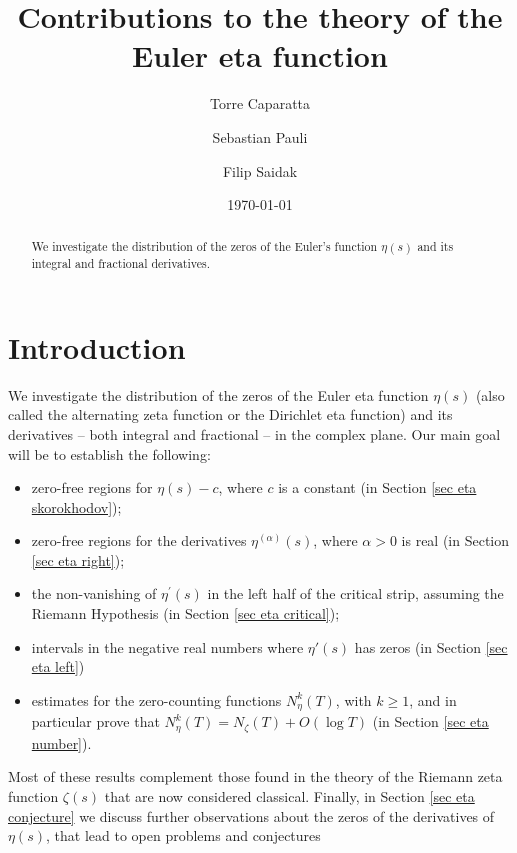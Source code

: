 \documentclass{amsart}
\title{Contributions to the theory of the Euler eta function}
\author[T. Caparatta]{Torre Caparatta}\email{tecapara@uncg.edu}
\author[S. Pauli]{Sebastian Pauli}\email{s\_pauli@uncg.edu}
\author[F. Saidak]{Filip Saidak}\email{f\_saidak@uncg.edu}
\date{\today}
\theoremstyle{plain}
\theoremstyle{definition}
\begin{document}
\maketitle

\begin{abstract}
We investigate the distribution of the zeros of the Euler's function $\eta(s)$ and its integral and fractional derivatives.
\end{abstract}


\section{Introduction}\label{sec eta intro}

We investigate the distribution of the zeros of the Euler eta function $\eta(s)$ (also called the alternating zeta function or the Dirichlet eta function) and its derivatives -- both integral and fractional -- in the complex plane. Our main goal will be to establish the following: 

\begin{itemize}
    \item zero-free regions for $\eta(s) - c$, where $c$ is a constant (in Section \ref{sec eta skorokhodov});
    \item zero-free regions for the derivatives $\eta^{(\alpha)}(s)$, where $\alpha > 0$ is real (in Section \ref{sec eta right});
    \item the non-vanishing of $\eta^{\prime}(s)$ in the left half of the critical strip, assuming the Riemann Hypothesis (in Section \ref{sec eta critical});
    \item intervals in the negative real numbers where $\eta'(s)$ has zeros (in Section \ref{sec eta left})
    \item estimates for the zero-counting functions $N_{\eta}^k(T)$, with $k \geq 1$, and in particular prove that $N_{\eta}^k(T) = N_{\zeta}(T) + O(\log T)$ (in Section \ref{sec eta number}).
\end{itemize}

Most of these results complement those found in the theory of the Riemann zeta function $\zeta(s)$ that are now considered classical. Finally, in Section \ref{sec eta conjecture} we discuss further observations
about the zeros of the derivatives of \(\eta(s)\), that lead to open problems and conjectures

\end{document}
